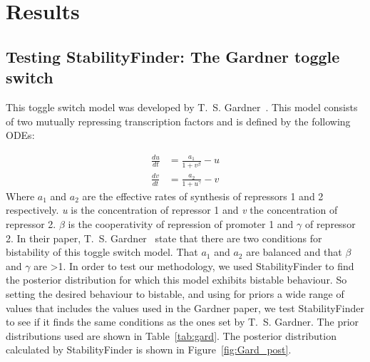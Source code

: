 \section{Results}
\subsection{Testing StabilityFinder: The Gardner toggle switch}

This toggle switch model was developed by T.~S. Gardner~\autocite{Gardner:2000vha}. This model consists of two mutually repressing transcription factors and is defined by the following ODEs:

\begin{align}
\frac{du}{dt} &= \frac{a_1}{1+v^{\beta}} - u \label{eq:gard_1} \\
\frac{dv}{dt} &= \frac{a_2}{1+u^{\gamma }} - v\label{eq:gard_2}
\end{align}
Where $a_1$ and $a_2$ are the effective rates of synthesis of repressors 1 and 2 respectively. \textit{u} is the concentration of repressor 1 and \textit{v} the concentration of repressor 2. \textit{$\beta$} is the cooperativity of repression of promoter 1 and \textit{$\gamma$} of repressor 2. In their paper,  T.~S. Gardner~\autocite{Gardner:2000vha} state that there are two conditions for bistability of this toggle switch model. That $a_1$ and $a_2$ are balanced and that $\beta$ and $\gamma$ are \textgreater 1. In order to test our methodology, we used StabilityFinder to find the posterior distribution for which this model exhibits bistable behaviour. So setting the desired behaviour to bistable, and using for priors a wide range of values that includes the values used in the Gardner paper, we test StabilityFinder to see if it finds the same conditions as the ones set by T.~S. Gardner. The prior distributions used are shown in Table~\ref{tab:gard}. The posterior distribution calculated by StabilityFinder is shown in Figure~\ref{fig:Gard_post}.

